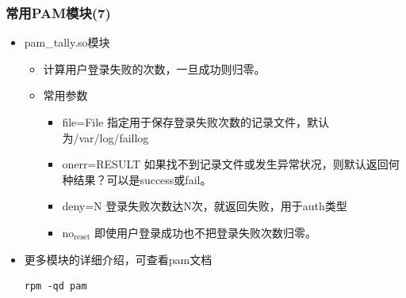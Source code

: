 \documentclass[xcolor=svgnames,presentation]{beamer}
\begin{document}
\begin{frame}[fragile]
\frametitle{常用PAM模块(7)}
\label{sec-6-16}
\begin{itemize}

\item pam\_tally.so模块
\label{sec-6-16-1}%
\begin{itemize}

\item 计算用户登录失败的次数，一旦成功则归零。
\label{sec-6-16-1-1}%

\item 常用参数
\label{sec-6-16-1-2}%
\begin{itemize}

\item file=File 指定用于保存登录失败次数的记录文件，默认为/var/log/faillog
\label{sec-6-16-1-2-1}%

\item onerr=RESULT 如果找不到记录文件或发生异常状况，则默认返回何种结果？可以是success或fail。
\label{sec-6-16-1-2-2}%

\item deny=N 登录失败次数达N次，就返回失败，用于auth类型
\label{sec-6-16-1-2-3}%

\item no$_{\mathrm{reset}}$ 即使用户登录成功也不把登录失败次数归零。
\label{sec-6-16-1-2-4}%
\end{itemize} %
\end{itemize} %

\item 更多模块的详细介绍，可查看pam文档\\
\label{sec-6-16-2}%
\begin{verbatim}
rpm -qd pam
\end{verbatim}
\end{itemize} %
\end{frame}
\end{document}
